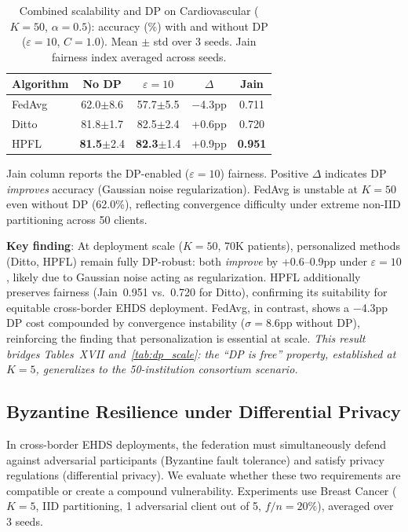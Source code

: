 \documentclass[conference,a4paper]{IEEEtran}
\begin{document}
\begin{table}[htbp]
\centering
\caption{Combined scalability and DP on Cardiovascular ($K{=}50$, $\alpha{=}0.5$): accuracy (\%) with and without DP ($\varepsilon{=}10$, $C{=}1.0$). Mean $\pm$ std over 3 seeds. Jain fairness index averaged across seeds.}
\label{tab:dp_scale_cv}
\small
\begin{tabular}{lcccc}
\toprule
\textbf{Algorithm} & \textbf{No DP} & \textbf{$\varepsilon{=}10$} & \textbf{$\Delta$} & \textbf{Jain} \\
\midrule
FedAvg & 62.0{\tiny$\pm$8.6} & 57.7{\tiny$\pm$5.5} & $-$4.3pp & 0.711 \\
Ditto & 81.8{\tiny$\pm$1.7} & 82.5{\tiny$\pm$2.4} & +0.6pp & 0.720 \\
HPFL & \textbf{81.5}{\tiny$\pm$2.4} & \textbf{82.3}{\tiny$\pm$1.4} & +0.9pp & \textbf{0.951} \\
\bottomrule
\end{tabular}

\vspace{1mm}
\footnotesize{Jain column reports the DP-enabled ($\varepsilon{=}10$) fairness. Positive $\Delta$ indicates DP \textit{improves} accuracy (Gaussian noise regularization). FedAvg is unstable at $K{=}50$ even without DP (62.0\%), reflecting convergence difficulty under extreme non-IID partitioning across 50 clients.}
\end{table}

\textbf{Key finding}: At deployment scale ($K{=}50$, 70K patients), personalized methods (Ditto, HPFL) remain fully DP-robust: both \textit{improve} by +0.6--0.9pp under $\varepsilon{=}10$, likely due to Gaussian noise acting as regularization. HPFL additionally preserves fairness (Jain~0.951 vs.\ 0.720 for Ditto), confirming its suitability for equitable cross-border EHDS deployment. FedAvg, in contrast, shows a $-$4.3pp DP cost compounded by convergence instability ($\sigma{=}8.6$pp without DP), reinforcing the finding that personalization is essential at scale. \textit{This result bridges Tables~XVII and~\ref{tab:dp_scale}: the ``DP is free'' property, established at $K{=}5$, generalizes to the 50-institution consortium scenario.}

\subsection{Byzantine Resilience under Differential Privacy}\label{sec:byzantine_dp}

In cross-border EHDS deployments, the federation must simultaneously defend against adversarial participants (Byzantine fault tolerance) and satisfy privacy regulations (differential privacy). We evaluate whether these two requirements are compatible or create a compound vulnerability. Experiments use Breast Cancer ($K{=}5$, IID partitioning, 1 adversarial client out of 5, $f/n{=}20\%$), averaged over 3 seeds.
\end{document}
